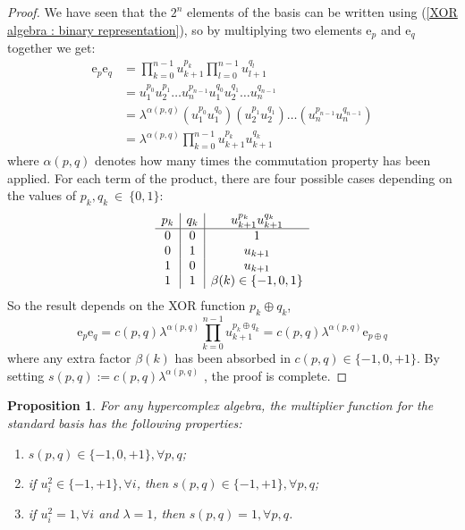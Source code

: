 \documentclass{article}
\newtheorem{proposition}[theorem]{Proposition}
\begin{document}
\begin{proof}
    We have seen that the $2^n$ elements of the basis can be written using (\ref{XOR algebra : binary representation}), so by multiplying two elements $\mathrm e_p$ and $\mathrm e_q$ together we get:
    $$ \begin{aligned}
        \mathrm e_p \mathrm e_q &= \prod_{k=0}^{n-1} u_{k+1}^{p_k} \prod_{l=0}^{n-1} u_{l+1}^{q_l}\\
        &= u_1^{p_0} u_{2}^{p_1} \ldots u_n^{p_{n-1}} u_1^{q_0} u_{2}^{q_1} \ldots u_n^{q_{n-1}}\\
        &= \lambda^{\alpha(p,q)} (u_1^{p_0}u_1^{q_0})(u_2^{p_1}u_2^{q_1}) \ldots (u_n^{p_{n-1}}u_n^{q_{n-1}})\\
        &= \lambda^{\alpha(p,q)} \prod_{k=0}^{n-1} u_{k+1}^{p_k}u_{k+1}^{q_k}
    \end{aligned} $$
    where $\alpha(p, q)$ denotes how many times the commutation property has been applied. For each term of the product, there are four possible cases depending on the values of $p_k, q_k~\in~\{0,1\}$:
    \begin{equation}
        \label{XOR algebra : XOR thm table}
        \begin{array}{c | c | c }
            p_k & q_k & u_{k+1}^{p_k}u_{k+1}^{q_k}\\
            \hline
            0 & 0 & 1\\
            0 & 1 & u_{k+1}\\
            1 & 0 & u_{k+1}\\
            1 & 1 & \beta(k) \in \{ -1, 0 ,1 \}
        \end{array}
    \end{equation}
    So the result depends on the XOR function $p_k \oplus q_k$,
    \begin{equation}
        \label{XOR algebra : XOR thm last equation}
        \mathrm e_p \mathrm e_q = c(p,q)\lambda^{\alpha(p,q)} \prod_{k=0}^{n-1} u_{k+1}^{p_k \oplus q_k} = c(p,q)\lambda^{\alpha(p,q)} \mathrm e_{p \oplus q}
    \end{equation}
    where any extra factor $\beta(k)$ has been absorbed in $c(p,q) \in \{ -1, 0 , +1 \}$. By setting $s(p,q) := c(p,q)\lambda^{\alpha(p,q)}$ , the proof is complete.
\end{proof}
\begin{proposition}
    \label{XOR algebra : values of s}
    For any hypercomplex algebra, the multiplier function for the standard basis has the following properties:
    \begin{enumerate}
        \item $s(p,q) \in \{ -1,0,+1 \}, \forall p,q$;
        \item if $u_i^2 \in \{ -1,+1 \}, \forall i$, then $s(p,q) \in \{ -1, +1 \}, \forall p,q$;
        \item if $u_i^2 =1, \forall i$ and $\lambda=1$, then $s(p,q) =1, \forall p,q$.
    \end{enumerate}
\end{proposition}
\end{document}

